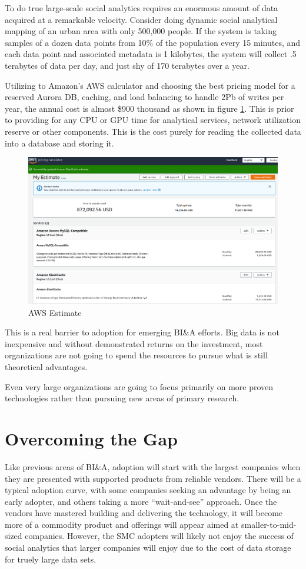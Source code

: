 To do true large-scale social analytics requires an enormous amount of data acquired at a remarkable velocity. Consider doing dynamic social analytical mapping of an urban area with only 500,000 people. If the system is taking  samples of a dozen data points from 10\% of the population every 15 minutes, and each data point and associated metadata is 1 kilobytes, the system will collect .5 terabytes of data per day, and just shy of 170 terabytes over a year.

Utilizing to Amazon's AWS calculator and choosing the best pricing model for a reserved Aurora DB, caching, and load balancing to handle 2Pb of writes per year, the annual cost is almost \$900 thousand as shown in figure \ref{fig:estimate}. This is prior to providing for any CPU or GPU time for analytical services, network utilization reserve or other components. This is the cost purely for reading the collected data into a database and storing it.

\begin{figure}
  \centering
  \includegraphics[width=.8\textwidth]{./img/estimate}
  \caption{AWS Estimate}
  \label{fig:estimate}
\end{figure}


This is a real barrier to adoption for emerging BI\&A efforts. Big data is not inexpensive and without demonstrated returns on the investment, most organizations are not going to spend the resources to pursue what is still theoretical advantages.

Even very large organizations are going to focus primarily on more proven technologies rather than pursuing new areas of primary research.

\section{Overcoming the Gap}

Like previous areas of BI\&A, adoption will start with the largest companies when they are presented with supported products from reliable vendors. There will be a typical adoption curve, with some companies seeking an advantage by being an early adopter, and others taking a more ``wait-and-see'' approach. Once the vendors have mastered building and delivering the technology, it will become more of a commodity product and offerings will appear aimed at smaller-to-mid-sized companies. However, the SMC adopters will likely not enjoy the success of social analytics that larger companies will enjoy due to the cost of data storage for truely large data sets.

